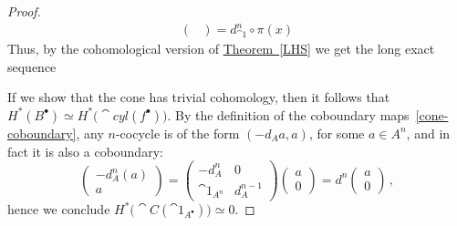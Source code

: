 \begin{lemma}
\begin{proof}
\begin{align*}
\begin{pmatrix}
            \end{pmatrix}
            = d^{n}_{\cat{1}} \circ \pi(x)
        \end{align*}
        Thus, by the cohomological version of 
        \hyperref[LHS]{Theorem~\ref*{LHS}} we get 
        the long exact sequence
        \begin{center}
        \end{center}
        If we show that the cone has trivial cohomology,
        then it follows that $H^{*}(B^{\bullet}) \simeq  
        H^{*}\big(\cat{cyl}(f^{\bullet})\big)$.
        By the definition of the coboundary maps~\eqref{cone-coboundary},
        any $n$-cocycle is of the form $(-d_{A}a,a)$, for some $a \in A^{n}$,
        and in fact it is also a coboundary:
        \begin{equation*}
            \begin{pmatrix}
                -d^{n}_{A}(a) \\ a
            \end{pmatrix}
            =
            \begin{pmatrix}
                -d^{n}_{A} & 0 \\ \cat{1}_{A^n} & d^{n-1}_{A}
            \end{pmatrix}
            \begin{pmatrix}
                a \\ 0
            \end{pmatrix}
            = d^{n} \begin{pmatrix}
                a \\ 0
            \end{pmatrix}\,,
        \end{equation*}
        hence we conclude $H^{*}\big(\cat{C}(\cat{1}_{A^{\bullet}})\big) \simeq 0$.
    \end{proof}
\end{lemma}

